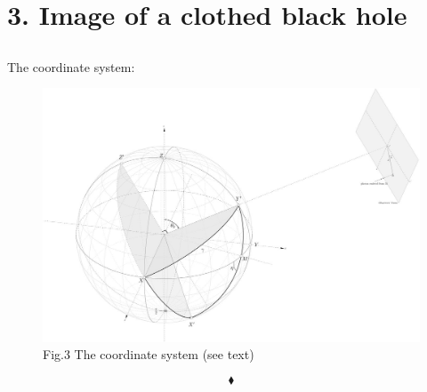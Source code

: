 \chapter{3. Image of a clothed black hole}
\pagebreak[4]

\section{}
\begin{tcolorbox}
The coordinate system:
\end{tcolorbox}

\begin{figure}[H]
\centering
    \includegraphics[width=1.1\textwidth]{./images/fig_Coordinates_system.jpg}
    \caption{Fig.3 The coordinate system (see text)}
\end{figure}


$$\blacklozenge$$\newpage